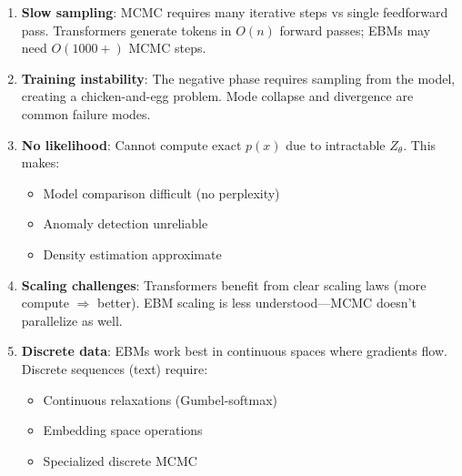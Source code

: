\begin{remark}\leavevmode
    \begin{enumerate}
        \item \textbf{Slow sampling}: MCMC requires many iterative steps vs single feedforward pass. Transformers generate tokens in $O(n)$ forward passes; EBMs may need $O(1000+)$ MCMC steps.

        \item \textbf{Training instability}: The negative phase requires sampling from the model, creating a chicken-and-egg problem. Mode collapse and divergence are common failure modes.

        \item \textbf{No likelihood}: Cannot compute exact $p(x)$ due to intractable $Z_\theta$. This makes:
        \begin{itemize}
            \item Model comparison difficult (no perplexity)
            \item Anomaly detection unreliable
            \item Density estimation approximate
        \end{itemize}

        \item \textbf{Scaling challenges}: Transformers benefit from clear scaling laws (more compute $\Rightarrow$ better). EBM scaling is less understood---MCMC doesn't parallelize as well.

        \item \textbf{Discrete data}: EBMs work best in continuous spaces where gradients flow. Discrete sequences (text) require:
        \begin{itemize}
            \item Continuous relaxations (Gumbel-softmax)
            \item Embedding space operations
            \item Specialized discrete MCMC
        \end{itemize}
    \end{enumerate}
\end{remark}


